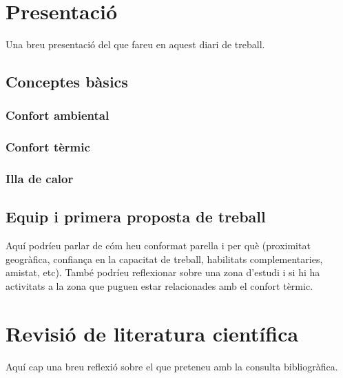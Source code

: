 



    



\tableofcontents
\listoffigures

\chapter{Presentació}
Una breu presentació del que fareu en aquest diari de treball.

\section{Conceptes bàsics}

\subsection{Confort ambiental}

\subsection{Confort tèrmic}

\subsection{Illa de calor}


\section{Equip i primera proposta de treball}
Aquí podríeu parlar de cóm heu conformat parella i per què (proximitat geogràfica, confiança en la capacitat de treball, habilitats complementaries, amistat, etc). També podríeu reflexionar sobre una zona d'estudi i si hi ha activitats a la zona que puguen estar relacionades amb el confort tèrmic.


\newpage


\chapter{Revisió de literatura científica}
Aquí cap una breu reflexió sobre el que preteneu amb la consulta bibliogràfica.

